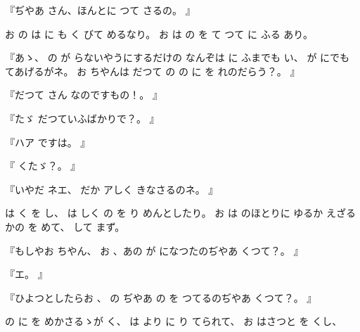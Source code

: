 
『ぢやあ
さん、ほんとに
つて
さるの。
』

お
の
は
に
も
く
びて
めるなり。
お
は
の
を
て
つて
に
ふる
あり。

『あゝ、
の
が
らないやうにするだけの
なんぞは
に
ふまでも
い、
が
にでも
てあげるがネ。
お
ちやんは
だつて
の
の
に
を
れのだらう？。
』

『だつて
さん
なのですもの！。
』

『たゞ
だつていふばかりで？。
』

『ハア
ですは。
』

『
くたゞ？。
』

『いやだ
ネエ、
だか
アしく
きなさるのネ。
』

は
く
を
し、
は
しく
の
を
り
めんとしたり。
お
は
のほとりに
ゆるか
えざるかの
を
めて、
して
まず。

『もしやお
ちやん、
お
、あの
が
になつたのぢやあ
くつて？。
』

『エ。
』

『ひよつとしたらお
、
の
ぢやあ
の
を
つてるのぢやあ
くつて？。
』

の
に
を
めかさるゝが
く、
は
より
に
り
てられて、
お
はさつと
を
くし、

